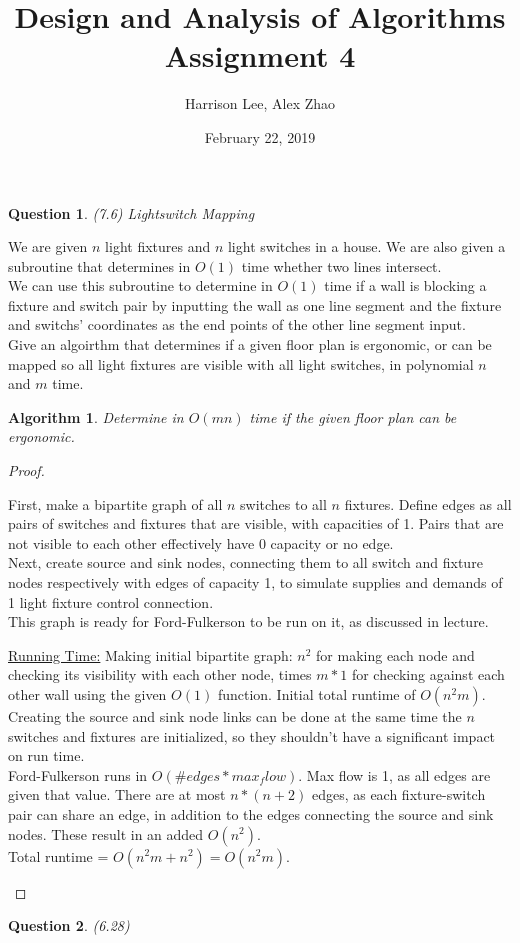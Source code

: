 \documentclass[11pt, oneside]{article}   	%
\title {Design and Analysis of Algorithms Assignment 4}
\author{Harrison Lee, Alex Zhao}
\date{February 22, 2019}
\newtheorem{Question}{Question}
\newtheorem{Algorithm}{Algorithm}
\begin{document}
\maketitle

\begin{Question} (7.6) Lightswitch Mapping \\
\end{Question}
\noindent We are given $n$ light fixtures and $n$ light switches in a house. We are also given a subroutine that determines in $O(1)$ time whether two lines intersect.\\
We can use this subroutine to determine in $O(1)$ time if a wall is blocking a fixture and switch pair by inputting the wall as one line segment and the fixture and switchs' coordinates as the end points of the other line segment input. \\
\noindent Give an algoirthm that determines if a given floor plan is ergonomic, or can be mapped so all light fixtures are visible with all light switches, in polynomial $n$ and $m$ time.

\begin{Algorithm}
Determine in $O(mn)$ time if the given floor plan can be ergonomic.
\end{Algorithm}

\begin{proof}
\begin{description}

First, make a bipartite graph of all $n$ switches to all $n$ fixtures. Define edges as all pairs of switches and fixtures that are visible, with capacities of 1. Pairs that are not visible to each other effectively have 0 capacity or no edge.\\
Next, create source and sink nodes, connecting them to all switch and fixture nodes respectively with edges of capacity 1, to simulate supplies and demands of 1 light fixture control connection. \\
This graph is ready for Ford-Fulkerson to be run on it, as discussed in lecture.

\underline{Running Time:} Making initial bipartite graph: $n^2$ for making each node and checking its visibility with each other node, times $m*1$ for checking against each other wall using the given $O(1)$ function. Initial total runtime of $O(n^2 m)$.\\
Creating the source and sink node links can be done at the same time the $n$ switches and fixtures are initialized, so they shouldn't have a significant impact on run time. \\
Ford-Fulkerson runs in $O( \#edges * max_flow)$. Max flow is 1, as all edges are given that value. There are at most $n*(n+2)$ edges, as each fixture-switch pair can share an edge, in addition to the edges connecting the source and sink nodes. These result in an added $O(n^2)$. \\
Total runtime = $O(n^2 m + n^2) = O(n^2 m)$.

\end{description}
\end{proof}


\newpage
\linespread{1.1}
\begin{Question} (6.28) 
\end{Question}
\end{document}
